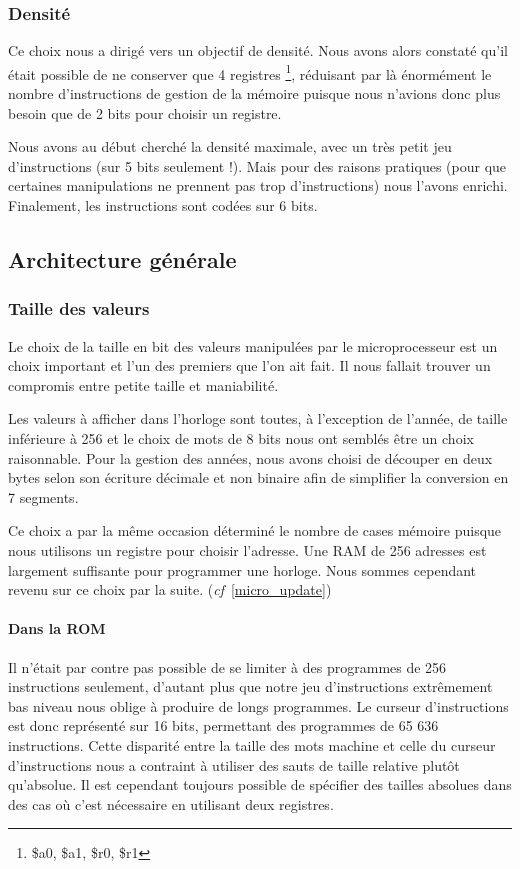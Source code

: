 \documentclass{article}
\begin{document}
\subsubsection{Densité}
Ce choix nous a dirigé vers un objectif de densité. Nous avons alors constaté
qu'il était possible de ne conserver que 4 registres
\footnote{\$a0, \$a1, \$r0, \$r1}, réduisant par là énormément le nombre
d'instructions de gestion de la mémoire puisque nous n'avions donc  plus besoin
que de 2 bits pour choisir un registre.

Nous avons au début cherché la densité maximale, avec un très petit jeu
d'instructions (sur 5 bits seulement !).
Mais pour des raisons pratiques (pour que certaines manipulations ne prennent pas
trop d'instructions) nous l'avons enrichi. Finalement, les instructions sont
codées sur 6 bits.


\subsection{Architecture générale}

\subsubsection{Taille des valeurs}
Le choix de la taille en bit des valeurs manipulées par le microprocesseur est
un choix important et l'un des premiers que l'on ait fait. Il nous fallait trouver
un compromis entre petite taille et maniabilité.

Les valeurs à afficher dans l'horloge sont toutes, à l'exception de l'année, de
taille inférieure à 256 et le choix de mots de 8 bits nous ont semblés être un
choix raisonnable. Pour la gestion des années, nous avons choisi de découper en
deux bytes selon son écriture décimale et non binaire afin de simplifier la
conversion en 7 segments.

Ce choix a par la même occasion déterminé le nombre de cases mémoire puisque nous utilisons un registre pour choisir l'adresse. Une RAM de 256 adresses est largement suffisante pour programmer une horloge. Nous sommes cependant revenu sur ce choix par la suite. (\emph{cf}~\ref{micro_update})

\paragraph{Dans la ROM}
Il n'était par contre pas possible de se limiter à des programmes de 256 instructions
seulement, d'autant plus que notre jeu d'instructions extrêmement bas niveau nous
oblige à produire de longs programmes. Le curseur d'instructions est donc représenté
sur 16 bits, permettant des programmes de 65 636 instructions. Cette disparité
entre la taille des mots machine et celle du curseur d'instructions nous a contraint
à utiliser des sauts de taille relative plutôt qu'absolue. Il est cependant toujours
possible de spécifier des tailles absolues dans des cas où c'est nécessaire en
utilisant deux registres.
\end{document}

